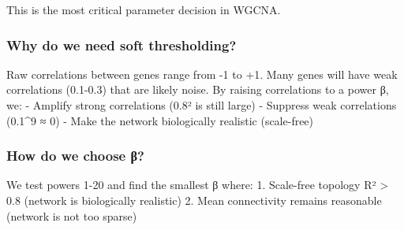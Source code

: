 \documentclass[
]{article}
\begin{document}
This is the most critical parameter decision in WGCNA.

\subsubsection{Why do we need soft
thresholding?}\label{why-do-we-need-soft-thresholding}

Raw correlations between genes range from -1 to +1. Many genes will have
weak correlations (0.1-0.3) that are likely noise. By raising
correlations to a power β, we: - Amplify strong correlations (0.8² is
still large) - Suppress weak correlations (0.1\^{}9 ≈ 0) - Make the
network biologically realistic (scale-free)

\subsubsection{How do we choose β?}\label{how-do-we-choose-ux3b2}

We test powers 1-20 and find the smallest β where: 1. Scale-free
topology R² \textgreater{} 0.8 (network is biologically realistic) 2.
Mean connectivity remains reasonable (network is not too sparse)
\end{document}
